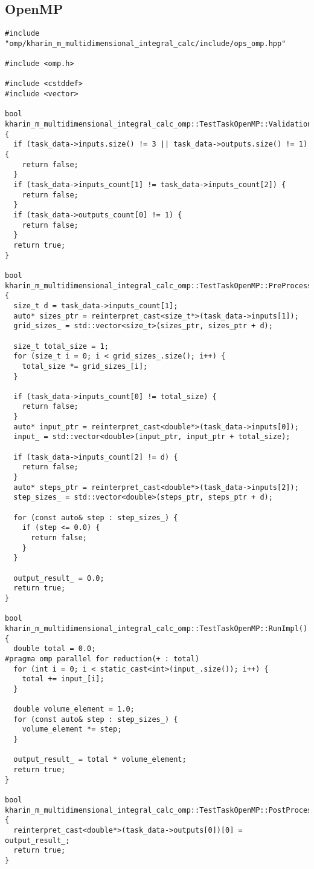 \documentclass[12pt]{article}
\begin{document}
\subsection*{OpenMP}
\begin{lstlisting}
#include "omp/kharin_m_multidimensional_integral_calc/include/ops_omp.hpp"

#include <omp.h>

#include <cstddef>
#include <vector>

bool kharin_m_multidimensional_integral_calc_omp::TestTaskOpenMP::ValidationImpl() {
  if (task_data->inputs.size() != 3 || task_data->outputs.size() != 1) {
    return false;
  }
  if (task_data->inputs_count[1] != task_data->inputs_count[2]) {
    return false;
  }
  if (task_data->outputs_count[0] != 1) {
    return false;
  }
  return true;
}

bool kharin_m_multidimensional_integral_calc_omp::TestTaskOpenMP::PreProcessingImpl() {
  size_t d = task_data->inputs_count[1];
  auto* sizes_ptr = reinterpret_cast<size_t*>(task_data->inputs[1]);
  grid_sizes_ = std::vector<size_t>(sizes_ptr, sizes_ptr + d);

  size_t total_size = 1;
  for (size_t i = 0; i < grid_sizes_.size(); i++) {
    total_size *= grid_sizes_[i];
  }

  if (task_data->inputs_count[0] != total_size) {
    return false;
  }
  auto* input_ptr = reinterpret_cast<double*>(task_data->inputs[0]);
  input_ = std::vector<double>(input_ptr, input_ptr + total_size);

  if (task_data->inputs_count[2] != d) {
    return false;
  }
  auto* steps_ptr = reinterpret_cast<double*>(task_data->inputs[2]);
  step_sizes_ = std::vector<double>(steps_ptr, steps_ptr + d);

  for (const auto& step : step_sizes_) {
    if (step <= 0.0) {
      return false;
    }
  }

  output_result_ = 0.0;
  return true;
}

bool kharin_m_multidimensional_integral_calc_omp::TestTaskOpenMP::RunImpl() {
  double total = 0.0;
#pragma omp parallel for reduction(+ : total)
  for (int i = 0; i < static_cast<int>(input_.size()); i++) {
    total += input_[i];
  }

  double volume_element = 1.0;
  for (const auto& step : step_sizes_) {
    volume_element *= step;
  }

  output_result_ = total * volume_element;
  return true;
}

bool kharin_m_multidimensional_integral_calc_omp::TestTaskOpenMP::PostProcessingImpl() {
  reinterpret_cast<double*>(task_data->outputs[0])[0] = output_result_;
  return true;
}
\end{lstlisting}
\end{document}
